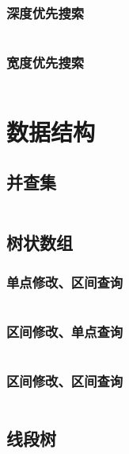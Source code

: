 \documentclass[a4paper,11pt]{article}
\begin{document}
\subsubsection{深度优先搜索}
\inputminted[linenos,autogobble]{java}{basic/search/dfs.java}

\subsubsection{宽度优先搜索}
\inputminted[linenos,autogobble]{java}{basic/search/bfs.java}


\newpage
\section{数据结构}

\subsection{并查集}
\inputminted[linenos,autogobble]{java}{data-structure/union-find.java}

\newpage
\subsection{树状数组}

\subsubsection{单点修改、区间查询}
\inputminted[linenos,autogobble]{java}{data-structure/binary-indexed-tree-1.java}

\subsubsection{区间修改、单点查询}
\inputminted[linenos,autogobble]{java}{data-structure/binary-indexed-tree-2.java}

\subsubsection{区间修改、区间查询}
\inputminted[linenos,autogobble]{java}{data-structure/binary-indexed-tree-3.java}

\newpage
\subsection{线段树}
\inputminted[linenos,autogobble]{java}{data-structure/segment-tree.java}

\newpage
\end{document}
